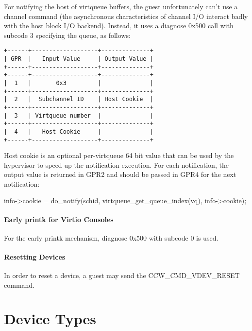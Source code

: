 For notifying the host of virtqueue buffers, the guest
unfortunately can't use a channel command (the asynchronous
characteristics of channel I/O interact badly with the host block
I/O backend). Instead, it uses a diagnose 0x500 call with subcode
3 specifying the queue, as follows:

\begin{verbatim}
+------+-------------------+--------------+
| GPR  |   Input Value     | Output Value |
+------+-------------------+--------------+
+------+-------------------+--------------+
|  1   |       0x3         |              |
+------+-------------------+--------------+
|  2   |  Subchannel ID    | Host Cookie  |
+------+-------------------+--------------+
|  3   | Virtqueue number  |              |
+------+-------------------+--------------+
|  4   |   Host Cookie     |              |
+------+-------------------+--------------+
\end{verbatim}

Host cookie is an optional per-virtqueue 64 bit value that can be
used by the hypervisor to speed up the notification execution.
For each notification, the output value is returned in GPR2 and
should be passed in GPR4 for the next notification:

        info->cookie = do_notify(schid,
                                 virtqueue_get_queue_index(vq),
                                 info->cookie);

\subsubsection{Early printk for Virtio Consoles}\label{sec:Virtio Transport Options / Virtio over channel I/O / Device Operation / Early printk for Virtio Consoles}

For the early printk mechanism, diagnose 0x500 with subcode 0 is
used.

\subsubsection{Resetting Devices}\label{sec:Virtio Transport Options / Virtio over channel I/O / Device Operation / Resetting Devices}

In order to reset a device, a guest may send the
CCW_CMD_VDEV_RESET command.


\chapter{Device Types}\label{sec:Device Types}

